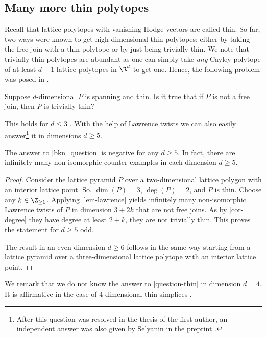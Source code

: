 \documentclass[reqno, 11pt, a4paper, oneside]{amsart}
\begin{document}
\subsection{Many more thin polytopes}

Recall that lattice polytopes with vanishing Hodge vectors are called thin. So far, two ways were known to get high-dimensional thin polytopes: either by taking the free join with a thin polytope or by just being trivially thin. We note that trivially thin polytopes are abundant as one can simply take {\em any} Cayley polytope of at least $d+1$ lattice polytopes in $\R^d$ to get one. Hence, the following problem was posed in \cite{borger_thin_2023}.

\begin{question}\label{bkn_question}
    Suppose $d$-dimensional $P$ is spanning and thin. Is it true that if $P$ is not a free join, then $P$ is trivially thin?
    \label{question-thin}
\end{question}

This holds for $d \le 3$ \cite{borger_thin_2023}. With the help of Lawrence twists we can also easily answer\footnote{After this question was resolved in the thesis of the first author, an independent answer was also given by Selyanin in the preprint \cite{selyanin2025newtonnumbersvanishingpolytopes}.} it in dimensions $d \ge 5$.

\begin{cor}
The answer to \cref{bkn_question} is negative for any $d \ge 5$. In fact, there are infinitely-many non-isomorphic counter-examples in each dimension $d \ge 5$. 
\end{cor}

\begin{proof}

Consider the lattice pyramid $P$ over a two-dimensional lattice polygon with an interior lattice point. So,  $\dim(P)=3$, $\deg(P)=2$, and $P$ is thin. Choose any $k \in \Z_{\ge1}$. Applying \cref{lem-lawrence} yields infinitely many non-isomorphic Lawrence twists of $P$ in dimension $3+2k$ that are not free joins. As by \cref{cor-degree} they have degree at least $2+k$, they are not trivially thin. This proves the statement for $d \ge 5$ odd. 

 The result in an even dimension $d \ge 6$ follows in the same way starting from a lattice pyramid over a three-dimensional lattice polytope with an interior lattice point.
\end{proof}

We remark that we do not know the answer to \cref{question-thin} in dimension $d=4$. It is affirmative in the case of $4$-dimensional thin simplices \cite{kurylenko_thin_2024}.
\end{document}
